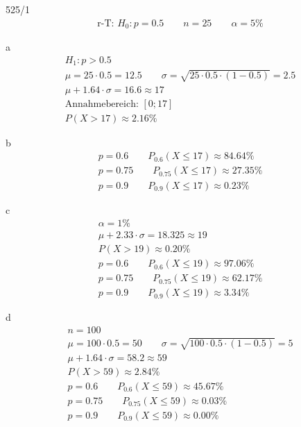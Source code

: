 \begin{exercise}{525/1}
  \begin{gather*}
    \text{r-T: } H_0 \colon p = 0.5 \qquad n = 25 \qquad \alpha = 5\%
  \end{gather*}
  \item [a]
  \begin{gather*}
    H_1 \colon p > 0.5 \\
    \mu = 25 \cdot 0.5 = 12.5 \qquad \sigma = \sqrt{25 \cdot 0.5 \cdot (1 - 0.5)} = 2.5 \\
    \mu + 1.64 \cdot \sigma = 16.6 \approx 17 \\
    \text{Annahmebereich: } [0; 17] \\
    P(X > 17) \approx 2.16\%
  \end{gather*}
  \item [b]
  \begin{gather*}
    p = 0.6 \qquad P_{0.6}(X \leq 17) \approx 84.64\% \\
    p = 0.75 \qquad P_{0.75}(X \leq 17) \approx 27.35\% \\
    p = 0.9 \qquad P_{0.9}(X \leq 17) \approx 0.23\%
  \end{gather*}
  \item [c]
  \begin{gather*}
    \alpha = 1\% \\
    \mu + 2.33 \cdot \sigma = 18.325 \approx 19 \\
    P(X > 19) \approx 0.20\% \\
    p = 0.6 \qquad P_{0.6}(X \leq 19) \approx 97.06\% \\
    p = 0.75 \qquad P_{0.75}(X \leq 19) \approx 62.17\% \\
    p = 0.9 \qquad P_{0.9}(X \leq 19) \approx 3.34\%
  \end{gather*}
  \item [d]
  \begin{gather*}
    n = 100 \\
    \mu = 100 \cdot 0.5 = 50 \qquad \sigma = \sqrt{100 \cdot 0.5 \cdot (1 - 0.5)} = 5 \\
    \mu + 1.64 \cdot \sigma = 58.2 \approx 59 \\
    P(X > 59) \approx 2.84\% \\
    p = 0.6 \qquad P_{0.6}(X \leq 59) \approx 45.67\% \\
    p = 0.75 \qquad P_{0.75}(X \leq 59) \approx 0.03\% \\
    p = 0.9 \qquad P_{0.9}(X \leq 59) \approx 0.00\%
  \end{gather*}
\end{exercise}
